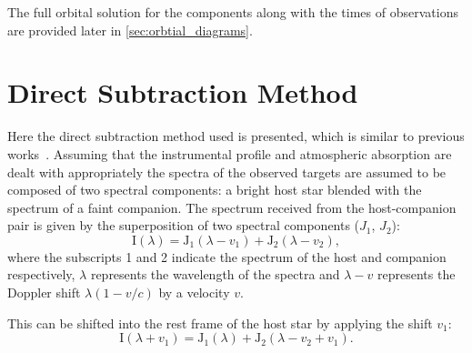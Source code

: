 The full orbital solution for the components along with the times of observations are provided later in \cref{sec:orbtial_diagrams}.


\section{Direct Subtraction Method}
\label{sec:direct-subtraction}
Here the direct subtraction method used is presented, which is similar to previous works~\citep{ferluga_separating_1997, kostogryz_spectral_2013}.
Assuming that the instrumental profile and atmospheric absorption are dealt with appropriately the spectra of the observed targets are assumed to be composed of two spectral components:
a bright host star blended with the spectrum of a faint companion.
The spectrum received from the host-companion pair is given by the superposition of two spectral components (\(J_{1}\), \(J_{2}\)):
\begin{equation}
\textrm{I}(\lambda) = \textrm{J}_{1}(\lambda - v_{1}) + \textrm{J}_{2}(\lambda - v_{2}),
\end{equation}
where the subscripts 1 and 2 indicate the spectrum of the host and companion respectively, \(\lambda\) represents the wavelength of the spectra and \(\lambda-v\) represents the Doppler shift \(\lambda(1-v/c)\) by a velocity \(v\).

This can be shifted into the rest frame of the host star by applying the shift \(v_1\):
\begin{equation}
\textrm{I}(\lambda + v_{1}) = \textrm{J}_{1}(\lambda) + \textrm{J}_{2}(\lambda - v_{2} + v_{1}).
\end{equation}

